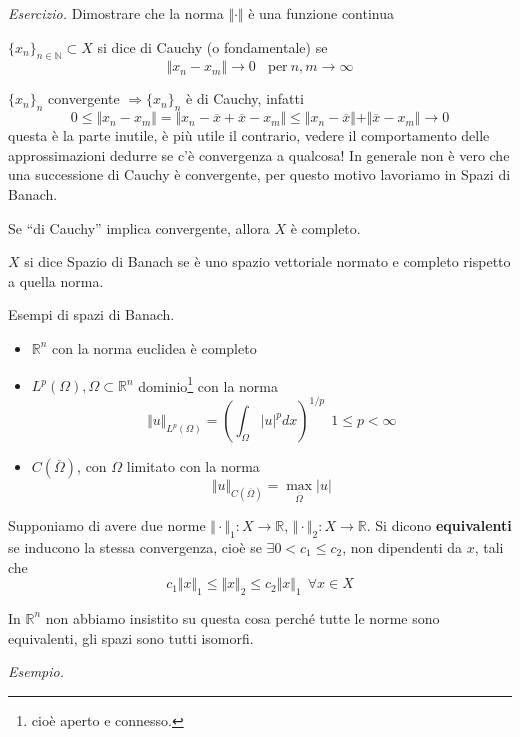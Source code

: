 \documentclass[10pt,a4paper,twoside,openright]{book}
\begin{document}
\textit{Esercizio.} Dimostrare che la norma $\Vert \cdotp \Vert $ è una funzione continua
\begin{definition}
$\{x_{n}\}_{n\in \mathbb{N}} \subset X$ si dice di Cauchy (o fondamentale) se
\begin{equation*}
\Vert x_{n} -x_{m}\Vert \rightarrow 0\ \ \ \ \text{per} \ n,m\rightarrow \infty 
\end{equation*}
\end{definition}
$\{x_{n}\}_{n}$ convergente $\Rightarrow \{x_{n}\}_{n}$ è di Cauchy, infatti
\begin{equation*}
0\leqslant \Vert x_{n} -x_{m}\Vert =\Vert x_{n} -\overline{x} +\overline{x} -x_{m}\Vert \leqslant \Vert x_{n} -\overline{x}\Vert +\Vert \overline{x} -x_{m}\Vert \rightarrow 0
\end{equation*}
questa è la parte inutile, è più utile il contrario, vedere il comportamento delle approssimazioni dedurre se c'è convergenza a qualcosa! In generale non è vero che una successione di Cauchy è convergente, per questo motivo lavoriamo in Spazi di Banach.
\begin{definition}
Se ``di Cauchy'' implica convergente, allora $X$ è completo.
\end{definition}
\begin{definition}
$X$ si dice Spazio di Banach se è uno spazio vettoriale normato e completo rispetto a quella norma.
\end{definition}
Esempi di spazi di Banach.
\begin{itemize}
\item $\mathbb{R}^{n}$ con la norma euclidea è completo
\item $L^{p}(\Omega),\Omega \subset \mathbb{R}^{n}$ dominio\footnote{cioè aperto e connesso.} con la norma\begin{equation*}
\Vert u\Vert _{L^{p}(\Omega)} =\left(\int _{\Omega }| u| ^{p} dx\right)^{1/p} \ \ 1\leqslant p< \infty 
\end{equation*}
\item $C(\overline{\Omega })$, con $\Omega $ limitato con la norma\begin{equation*}
\Vert u\Vert _{C(\overline{\Omega })} =\max_{\overline{\Omega }}| u| 
\end{equation*}
\end{itemize}
\begin{definition}
Supponiamo di avere due norme $\Vert \cdotp \Vert _{1} :X\rightarrow \mathbb{R}$, $\Vert \cdotp \Vert _{2} :X\rightarrow \mathbb{R}$. Si dicono \textbf{equivalenti} se inducono la stessa convergenza, cioè se $\exists 0< c_{1} \leqslant c_{2}$, non dipendenti da $x$, tali che
\begin{equation*}
c_{1}\Vert x\Vert _{1} \leqslant \Vert x\Vert _{2} \leqslant c_{2}\Vert x\Vert _{1} \ \ \forall x\in X
\end{equation*}
\end{definition}
\begin{nb}
In $\mathbb{R}^{n}$ non abbiamo insistito su questa cosa perché tutte le norme sono equivalenti, gli spazi sono tutti isomorfi.
\end{nb}
\textit{Esempio.}
\end{document}
